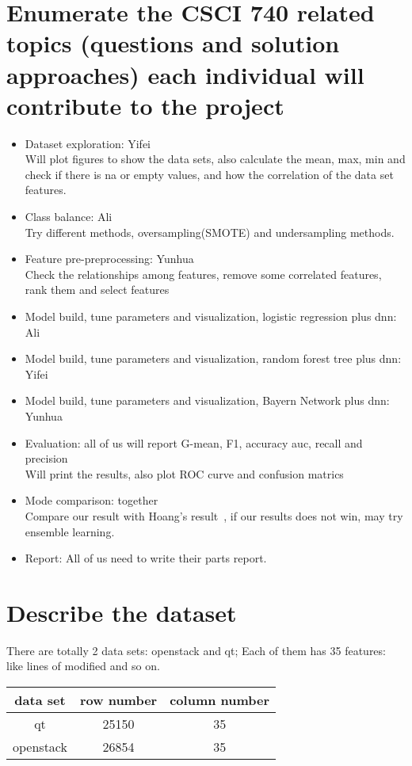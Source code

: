 \documentclass{article}
\begin{document}
\section{Enumerate the CSCI 740 related topics (questions and solution approaches) each individual will contribute
	to the project}
\begin{itemize}
	\item Dataset exploration: Yifei\\
	Will plot figures to show the data sets, also calculate the mean, max, min and check if there is na or empty values, and how the correlation of the data set features.
	\item Class balance: Ali  \\
	Try different methods, oversampling(SMOTE) and undersampling methods.
	\item Feature pre-preprocessing: Yunhua  \\
	Check the relationships among features, remove some correlated features, rank them and select features
	\item Model build, tune parameters and visualization, logistic regression plus dnn: Ali
	\item Model build, tune parameters and visualization, random forest tree plus dnn: Yifei
	\item Model build, tune parameters and visualization, Bayern Network plus dnn: Yunhua
	\item Evaluation: all of us will report G-mean, F1, accuracy auc, recall and precision \\
	Will print the results, also plot ROC curve and confusion matrics
	\item Mode comparison: together \\
	Compare our result with Hoang's result~\cite{hoang2019deepjit}, if our results does not win, may try ensemble learning.
	\item Report: All of us need to write their parts report.
\end{itemize}

\section{Describe the dataset}
There are totally 2 data sets: openstack and qt; Each of them has 35 features: like lines of modified and so on.
\begin{center}
	\begin{tabular}{ c c c }
		data set & row number & column number \\ 
		\hline
		qt & 25150 & 35 \\ 
		openstack & 26854 & 35 \\  
		\hline
	\end{tabular}
\end{center}
\end{document}
